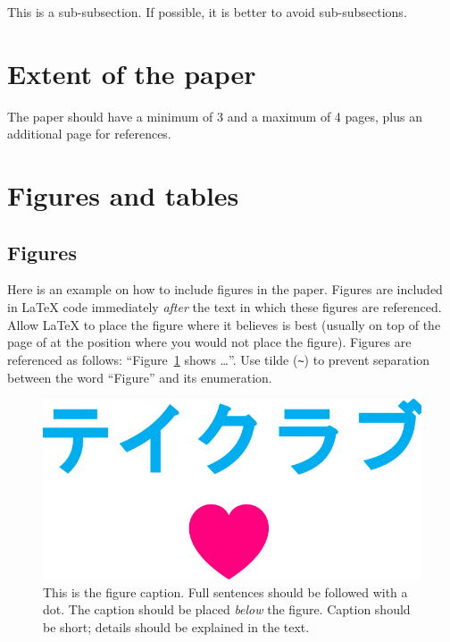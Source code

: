 \documentclass[10pt, a4paper]{article}
\begin{document}
This is a sub-subsection. If possible, it is better to avoid sub-subsections. 

\section{Extent of the paper}

The paper should have a minimum of 3 and a maximum of 4 pages, plus an additional page for references.

\section{Figures and tables}

\subsection{Figures}

Here is an example on how to include figures in the paper. Figures are included in \LaTeX{} code immediately \textit{after} the text in which these figures are referenced. Allow \LaTeX{} to place the figure where it believes is best (usually on top of the page of at the position where you would not place the figure). Figures are referenced as follows: ``Figure~\ref{fig:figure1} shows \dots''. Use tilde (\verb.~.) to prevent separation between the word ``Figure'' and its enumeration. 

\begin{figure}
\begin{center}
\includegraphics[width=\columnwidth]{drawing.pdf}
\caption{This is the figure caption. Full sentences should be followed with a dot. The caption should be placed \textit{below} the figure. Caption should be short; details should be explained in the text.}
\label{fig:figure1}
\end{center}
\end{figure}
\end{document}
